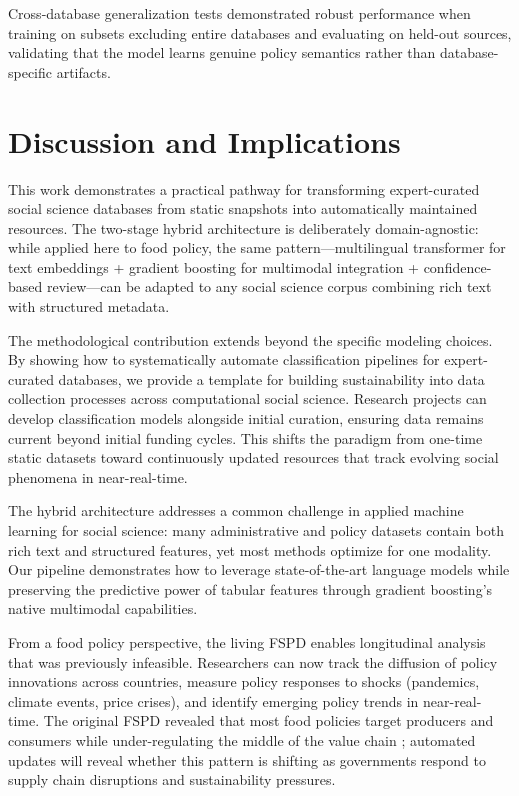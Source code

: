 \documentclass[a4paper,12pt]{article}
\begin{document}
Cross-database generalization tests demonstrated robust performance when training on subsets excluding entire databases and evaluating on held-out sources, validating that the model learns genuine policy semantics rather than database-specific artifacts.

\section*{Discussion and Implications}

This work demonstrates a practical pathway for transforming expert-curated social science databases from static snapshots into automatically maintained resources. The two-stage hybrid architecture is deliberately domain-agnostic: while applied here to food policy, the same pattern---multilingual transformer for text embeddings + gradient boosting for multimodal integration + confidence-based review---can be adapted to any social science corpus combining rich text with structured metadata.

The methodological contribution extends beyond the specific modeling choices. By showing how to systematically automate classification pipelines for expert-curated databases, we provide a template for building sustainability into data collection processes across computational social science. Research projects can develop classification models alongside initial curation, ensuring data remains current beyond initial funding cycles. This shifts the paradigm from one-time static datasets toward continuously updated resources that track evolving social phenomena in near-real-time.

The hybrid architecture addresses a common challenge in applied machine learning for social science: many administrative and policy datasets contain both rich text and structured features, yet most methods optimize for one modality. Our pipeline demonstrates how to leverage state-of-the-art language models while preserving the predictive power of tabular features through gradient boosting's native multimodal capabilities.

From a food policy perspective, the living FSPD enables longitudinal analysis that was previously infeasible. Researchers can now track the diffusion of policy innovations across countries, measure policy responses to shocks (pandemics, climate events, price crises), and identify emerging policy trends in near-real-time. The original FSPD revealed that most food policies target producers and consumers while under-regulating the middle of the value chain \cite{lowder2025}; automated updates will reveal whether this pattern is shifting as governments respond to supply chain disruptions and sustainability pressures.
\end{document}

